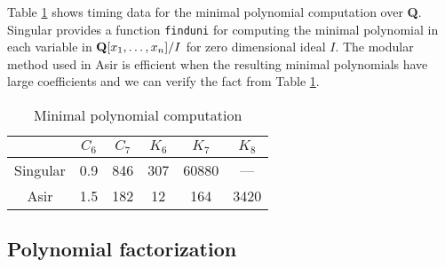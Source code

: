 \documentclass[runningheads]{cl2emult}
\begin{document}
Table \ref{minipoly} shows timing data for the minimal polynomial
computation over {\bf Q}. Singular provides a function {\tt finduni}
for computing the minimal polynomial in each variable in ${\bf
Q}[x_1,\ldots,x_n]/I$ for zero dimensional ideal $I$. The modular
method used in Asir is efficient when the resulting minimal
polynomials have large coefficients and we can verify the fact from Table
\ref{minipoly}.
\begin{table}[hbtp]
\begin{center}
\begin{tabular}{|c||c|c|c|c|c|} \hline
		& $C_6$ & $C_7$ & $K_6$ & $K_7$ & $K_8$ \\ \hline
Singular & 0.9 & 846 & 307 & 60880 & ---  \\ \hline
Asir & 1.5 & 182 & 12 & 164 & 3420  \\ \hline
\end{tabular}
\end{center}
\caption{Minimal polynomial computation}
\label{minipoly}
\end{table}

\subsection{Polynomial factorization}

%
\end{document}
